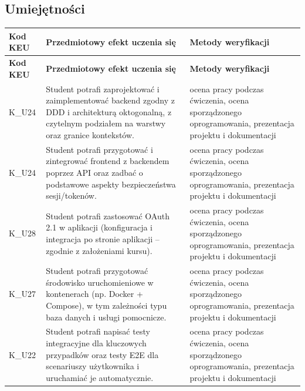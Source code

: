 \documentclass[12pt, a4paper]{article}
\newcommand{\thdrule}{\noalign{\global\setlength{\extrarowheight}{0pt}}}
\newcommand{\thdend}{\noalign{\global\setlength{\extrarowheight}{3pt}}}
\begin{document}
\subsection*{Umiejętności}
{\scriptsize
\begin{longtable}{m{1.6cm}m{9.0cm}m{4.2cm}}
\thdrule\toprule
\rowcolor{pjatkRed} {\color{white}\footnotesize\textbf{\vphantom{Ag}Kod KEU}} & {\color{white}\footnotesize\textbf{\vphantom{Ag}Przedmiotowy efekt uczenia się}} & {\color{white}\footnotesize\textbf{\vphantom{Ag}Metody weryfikacji}} \\
\midrule\thdend
\endfirsthead
\thdrule\toprule
\rowcolor{pjatkRed} {\color{white}\footnotesize\textbf{\vphantom{Ag}Kod KEU}} & {\color{white}\footnotesize\textbf{\vphantom{Ag}Przedmiotowy efekt uczenia się}} & {\color{white}\footnotesize\textbf{\vphantom{Ag}Metody weryfikacji}} \\
\midrule\thdend
\endhead
  \rowcolor{tableRowLight} K\_U24 & Student potrafi zaprojektować i zaimplementować backend zgodny z DDD i architekturą oktogonalną, z czytelnym podziałem na warstwy oraz granice kontekstów. & ocena pracy podczas ćwiczenia, ocena sporządzonego oprogramowania, prezentacja projektu i dokumentacji \\
  \rowcolor{tableRowAlt} K\_U24 & Student potrafi przygotować i zintegrować frontend z backendem poprzez API oraz zadbać o podstawowe aspekty bezpieczeństwa sesji/tokenów. & ocena pracy podczas ćwiczenia, ocena sporządzonego oprogramowania, prezentacja projektu i dokumentacji \\
  \rowcolor{tableRowLight} K\_U28 & Student potrafi zastosować OAuth 2.1 w aplikacji (konfiguracja i integracja po stronie aplikacji – zgodnie z założeniami kursu). & ocena pracy podczas ćwiczenia, ocena sporządzonego oprogramowania, prezentacja projektu i dokumentacji \\
  \rowcolor{tableRowAlt} K\_U27 & Student potrafi przygotować środowisko uruchomieniowe w kontenerach (np. Docker + Compose), w tym zależności typu baza danych i usługi pomocnicze. & ocena pracy podczas ćwiczenia, ocena sporządzonego oprogramowania, prezentacja projektu i dokumentacji \\
  \rowcolor{tableRowLight} K\_U22 & Student potrafi napisać testy integracyjne dla kluczowych przypadków oraz testy E2E dla scenariuszy użytkownika i uruchamiać je automatycznie. & ocena pracy podczas ćwiczenia, ocena sporządzonego oprogramowania, prezentacja projektu i dokumentacji \\
\bottomrule
\end{longtable}}
\end{document}

